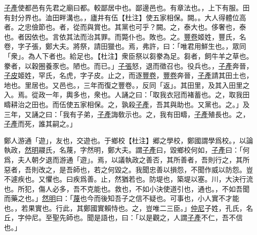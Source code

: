\documentclass{article}
\newcommand{\tsu}{\small\kaishu\color{brown}}
\newcommand{\ta}{\small\kaishu\color{applegreen}}
\begin{document}
\uline{子產}使都{\tsu 邑有先君之廟曰都。較鄙居中也。}鄙{\tsu 邊邑也。}有章{\tsu 法也。}，上下有服。田有封{\tsu 分界也。}洫{\tsu 田畔溝也。}，廬{\tsu {\ta{【杜注】廬舍也。}}}井{\tsu {\ta 【杜注】以九夫以井。}}有伍{\tsu\ta 【杜注】使五家相保。}{\tsu 闕。}。大人{\tsu 得體位高者。}之忠儉{\tsu 節也。}者，從而與{\tsu 賞也。其黨也可乎？闕。}之，泰{\tsu 大也。}侈{\tsu 奢也，泰也。}者因{\tsu 依也。言依其法而治其罪。}而斃{\tsu 仆也。敗也。}之。\uline{豐卷}{\tsu 姬姓，豐氏，名卷，字子張，鄭大夫。}將祭，請田{\tsu 獵也。}焉，弗許，曰：「唯君用鮮{\tsu 生也。}，眾{\tsu 同「衆」。為人下者也。}給{\tsu 足也。{\ta 【杜注】衆臣祭以芻豢為足。}芻者，飼牛羊之草也。豢者，以穀圈養豕也。陋也。}而已。」\uline{子張}怒，退而徵{\tsu 召也。}役{\tsu 兵也。}，\uline{子產}奔晉，\uline{子皮}{\tsu 姬姓，罕氏，名虎，字子皮。}止之，而逐\uline{豐卷}，\uline{豐卷}奔晉，\uline{子產}請其田{\tsu 土也，地也。}里{\tsu 居也。又邑也。}，三年而復之{\tsu 豐卷。}，反{\tsu 同「返」。}其田里，及其入{\tsu 田里之入。}焉。從政一年，輿{\tsu 多也，衆也。}人誦之曰：「取我衣冠而褚{\tsu 蓄也。}之，取我田疇{\tsu 耕治之田也。}而伍{\tsu 使五家相保。}之，孰殺\uline{子產}，吾其與{\tsu 助也。又黨也。}之。」及三年，又誦之曰：「我有子弟，\uline{子產}誨{\tsu 敎示也。}之，我有田疇，\uline{子產}殖{\tsu 長也。}之，\uline{子產}而死，誰其嗣之。」


\noindent{\tsu 襄公三十一年}

鄭人游{\tsu 通「遊」，友也，交遊也。}于鄉校{\ta 【杜注】郷之學校，鄭國謂學爲校。}，以論執政，\uline{然明}{\tsu 鬷氏，名蔑，字然明，鄭大夫。}謂\uline{子產}曰，毀鄉校何如，\uline{子產}曰：「何爲，夫人朝夕退而游{\tsu 通「遊」。}焉，以議執政之善否，其所善者，吾則行之，其所惡者，吾則改之，是吾師也，若之何毀之。我聞忠善以損怨，不聞作威以防怨。豈不遽{\tsu 疾也。又懼也。曰疾爲善。}止，然猶{\tsu 若也。}防{\tsu 堤也，築堤以塞。}川，大決{\tsu 行流也。}所犯，傷人必多，吾不克{\tsu 能也。}救也，不如小決使道{\tsu 引也，通也。}，不如吾聞而藥之也。」\uline{然明}曰：「\uline{蔑}也今而後知吾子之信{\tsu 不疑也。}可事也，小人實不才{\tsu 能也。}，若果{\tsu 實也。}行此，其鄭國實賴{\tsu 恃也。}之，豈唯二三臣。」\uline{仲尼}{\tsu 子姓，孔氏，名丘，字仲尼。至聖先師也。}聞是語也，曰：「以是觀之，人謂\uline{子產}不仁，吾不信也。」
\end{document}
